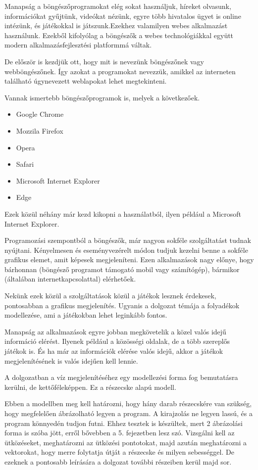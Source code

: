 
\cite{alk}

Manapság a böngészőprogramokat elég sokat használjuk, híreket olvasunk, információkat gyűjtünk, videókat nézünk, egyre több hivatalos ügyet is online intézünk, és játékokkal is játszunk.Ezekhez valamilyen webes alkalmazást használunk. Ezekből kifolyólag a böngészők a webes technológiákkal együtt modern alkalmazásfejlesztési platformmá váltak.


De először is kezdjük ott, hogy mit is nevezünk böngészőnek vagy webböngészőnek. Így azokat a programokat nevezzük, amikkel az interneten található úgynevezett weblapokat lehet megtekinteni. 

Vannak ismertebb böngészőprogramok is, melyek a következőek.

\begin{itemize}
	\item Google Chrome
	\item Mozzila Firefox
	\item Opera
	\item Safari
	\item Microsoft Internet Explorer
	\item Edge
\end{itemize}

Ezek közül néhány már kezd kikopni a használatból, ilyen például a Microsoft Internet Explorer. 
 

Programozási szempontból a böngészők, már nagyon sokféle szolgáltatást tudnak nyújtani. Kényelmesen és eseményvezérelt módon tudjuk kezelni benne a sokféle grafikus elemet, amit képesek megjeleníteni. Ezen alkalmazások nagy előnye, hogy bárhonnan (böngésző programot támogató mobil vagy számítógép), bármikor (általában internetkapcsolattal) elérhetőek. 

Nekünk ezek közül a szolgáltatások közül a játékok lesznek érdekesek, pontosabban a grafikus megjelenítés. Ugyanis a dolgozat témája a folyadékok modellezése, ami a játékokban lehet leginkább fontos.  

\cite{valos}

Manapság az alkalmazások egyre jobban megkövetelik a közel valós idejű információ elérést. Ilyenek például a közösségi oldalak, de a több szereplős játékok is. És ha már az információk elérése valós idejű, akkor a játékok megjelenítésének is valós idejűen kell lennie.

A dolgozatban a víz megjelenítéséhez egy modellezési forma fog bemutatásra kerülni, de kettőféleképpen. Ez a részecske alapú modell.


Ebben a modellben meg kell határozni, hogy hány darab részecskére van szükség, hogy megfelelően ábrázolható legyen a program. A kirajzolás ne legyen lassú, és a program könnyedén tudjon futni. Ehhez tesztek is készültek, mert 2 ábrázolási forma is szóba jött, erről bővebben a 5. fejezetben lesz szó. Vizsgálni kell az ütközéseket, meghatározni az ütközési pontotokat, majd azután meghatározni a vektorokat, hogy merre folytatja útját a részecske és milyen sebességgel. De ezeknek a pontosabb leírására a dolgozat további részeiben kerül majd sor. 



